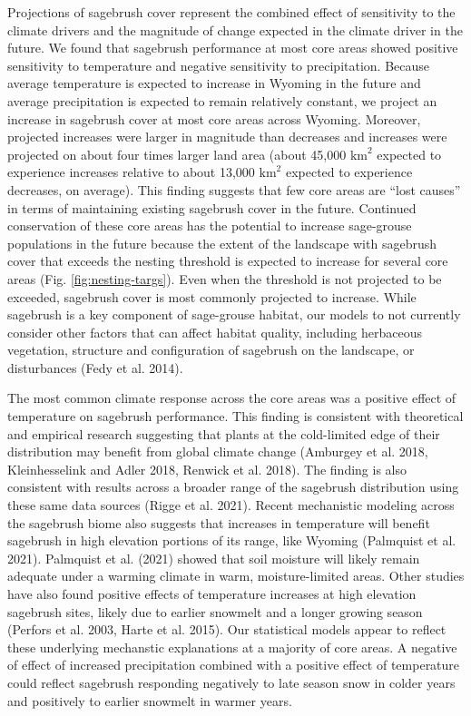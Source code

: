 \documentclass[
  12pt,
]{article}
\begin{document}
Projections of sagebrush cover represent the combined effect of sensitivity to the climate drivers and the magnitude of change expected in the climate driver in the future.
We found that sagebrush performance at most core areas showed positive sensitivity to temperature and negative sensitivity to precipitation.
Because average temperature is expected to increase in Wyoming in the future and average precipitation is expected to remain relatively constant, we project an increase in sagebrush cover at most core areas across Wyoming.
Moreover, projected increases were larger in magnitude than decreases and increases were projected on about four times larger land area (about 45,000 \(\text{km}^2\) expected to experience increases relative to about 13,000 \(\text{km}^2\) expected to experience decreases, on average).
This finding suggests that few core areas are ``lost causes'' in terms of maintaining existing sagebrush cover in the future.
Continued conservation of these core areas has the potential to increase sage-grouse populations in the future because the extent of the landscape with sagebrush cover that exceeds the nesting threshold is expected to increase for several core areas (Fig. \ref{fig:nesting-targs}).
Even when the threshold is not projected to be exceeded, sagebrush cover is most commonly projected to increase.
While sagebrush is a key component of sage-grouse habitat, our models to not currently consider other factors that can affect habitat quality, including herbaceous vegetation, structure and configuration of sagebrush on the landscape, or disturbances (Fedy et al. 2014).

The most common climate response across the core areas was a positive effect of temperature on sagebrush performance.
This finding is consistent with theoretical and empirical research suggesting that plants at the cold-limited edge of their distribution may benefit from global climate change (Amburgey et al. 2018, Kleinhesselink and Adler 2018, Renwick et al. 2018).
The finding is also consistent with results across a broader range of the sagebrush distribution using these same data sources (Rigge et al. 2021).
Recent mechanistic modeling across the sagebrush biome also suggests that increases in temperature will benefit sagebrush in high elevation portions of its range, like Wyoming (Palmquist et al. 2021).
Palmquist et al. (2021) showed that soil moisture will likely remain adequate under a warming climate in warm, moisture-limited areas.
Other studies have also found positive effects of temperature increases at high elevation sagebrush sites, likely due to earlier snowmelt and a longer growing season (Perfors et al. 2003, Harte et al. 2015).
Our statistical models appear to reflect these underlying mechanstic explanations at a majority of core areas.
A negative of effect of increased precipitation combined with a positive effect of temperature could reflect sagebrush responding negatively to late season snow in colder years and positively to earlier snowmelt in warmer years.
\end{document}
